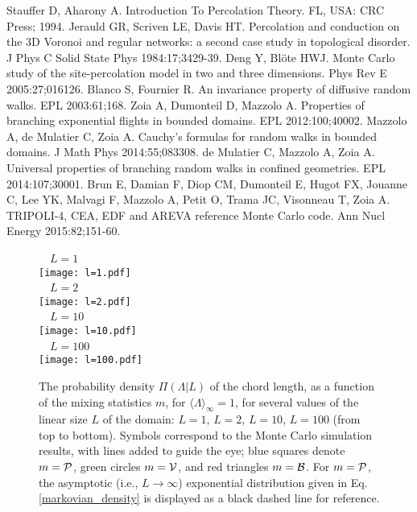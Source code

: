 \documentclass[final,authoryear,5p,times,twocolumn]{elsarticle}
\begin{document}
\begin{thebibliography}{10}
 Stauffer D, Aharony A. Introduction To Percolation Theory. FL, USA: CRC Press; 1994.
 Jerauld GR, Scriven LE, Davis HT. Percolation and conduction on the 3D Voronoi and regular networks: a second case study in topological disorder. J Phys C Solid State Phys 1984:17;3429-39. 
 Deng Y, Bl\"ote HWJ. Monte Carlo study of the site-percolation model in two and three dimensions. Phys Rev E 2005:27;016126.
 Blanco S, Fournier R. An invariance property of diffusive random walks. EPL 2003:61;168.
 Zoia A, Dumonteil D, Mazzolo A. Properties of branching exponential flights in bounded domains. EPL 2012:100;40002.
 Mazzolo A, de Mulatier C, Zoia A. Cauchy's formulas for random walks in bounded domains. J Math Phys 2014:55;083308.
 de Mulatier C, Mazzolo A, Zoia A. Universal properties of branching random walks in confined geometries. EPL 2014:107;30001.
 Brun E, Damian F, Diop CM, Dumonteil E, Hugot FX, Jouanne C, Lee YK, Malvagi F, Mazzolo A, Petit O, Trama JC, Visonneau T, Zoia A. TRIPOLI-4, CEA, EDF and AREVA reference Monte Carlo code. Ann Nucl Energy 2015:82;151-60.

\end{thebibliography}

\begin{figure*}[t]
\begin{center}
\,\,\,\, $L=1$ \,\,\,\,\\
\texttt{[image: l=1.pdf]}\\
\,\,\,\, $L=2$ \,\,\,\,\\
\texttt{[image: l=2.pdf]}\\
\,\,\,\, $L=10$ \,\,\,\,\\
\texttt{[image: l=10.pdf]}\\
\,\,\,\, $L=100$ \,\,\,\,\\
\texttt{[image: l=100.pdf]}\\
\end{center}
\caption{The probability density $\Pi(\Lambda | L)$ of the chord length, as a function of the mixing statistics $m$, for ${\langle \Lambda \rangle}_{\infty}=1$, for several values of the linear size $L$ of the domain: $L=1$, $L=2$, $L=10$, $L=100$ (from top to bottom). Symbols correspond to the Monte Carlo simulation results, with lines added to guide the eye; blue squares denote $m={\cal P}$, green circles $m={\cal V}$, and red triangles $m={\cal B}$. For $m={\cal P}$, the asymptotic (i.e., $L \rightarrow \infty $) exponential distribution given in Eq.\ref{markovian_density} is displayed as a black dashed line for reference.}
\label{cl_distrib}
\end{figure*}
\end{document}
